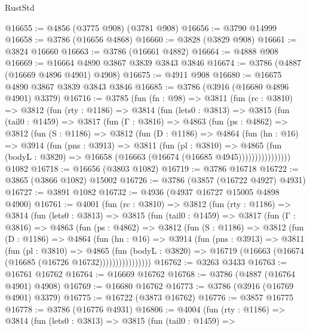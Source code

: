 \begin{lexlean}{RustStd}
\begin{coremodule}
@16655 := @4856 (@3775 @908) (@3781 @908)
@16656 := @3790 @14999
@16658 := @3786 (@16656 @4868)
@16660 := @3828 (@3829 @908)
@16661 := @3824 @16660
@16663 := @3786 (@16661 @4882)
@16664 := @4888 @908
@16669 := @16664 @4890 @3867 @3839 @3843 @3846
@16674 := @3786 (@4887 (@16669 @4896 @4901) @4908)
@16675 := @4911 @908
@16680 := @16675 @4890 @3867 @3839 @3843 @3846
@16685 := @3786 (@3916 (@16680 @4896 @4901) @3379)
@16716 := @3785
    (fun (fn : @98) =>
    @3811
      (fun (rc : @3810) =>
      @3812
        (fun (rty : @1186) =>
        @3814
          (fun (lets0 : @3813) =>
          @3815
            (fun (tail0 : @1459) =>
            @3817
              (fun (Γ : @3816) =>
              @4863
                (fun (ps : @4862) =>
                @3812
                  (fun (S : @1186) =>
                  @3812
                    (fun (D : @1186) =>
                    @4864
                      (fun (hn : @16) =>
                      @3914
                        (fun (pns : @3913) =>
                        @3811
                          (fun (pl : @3810) =>
                          @4865
                            (fun (bodyL : @3820) =>
                            @16658 (@16663 (@16674 (@16685 @4945))))))))))))))))
    @1082
@16718 := @16656 (@3803 @1082)
@16719 := @3786 @16718
@16722 := @3865 (@3866 @1082) @15002
@16726 := @3786 (@3857 (@16722 @4927) @4931)
@16727 := @3891 @1082
@16732 := @4936 (@4937 @16727 @15005 @4898 @4900)
@16761 := @4001
    (fun (rc : @3810) =>
    @3812
      (fun (rty : @1186) =>
      @3814
        (fun (lets0 : @3813) =>
        @3815
          (fun (tail0 : @1459) =>
          @3817
            (fun (Γ : @3816) =>
            @4863
              (fun (ps : @4862) =>
              @3812
                (fun (S : @1186) =>
                @3812
                  (fun (D : @1186) =>
                  @4864
                    (fun (hn : @16) =>
                    @3914
                      (fun (pns : @3913) =>
                      @3811
                        (fun (pl : @3810) =>
                        @4865
                          (fun (bodyL : @3820) =>
                          @16719 (@16663 (@16674 (@16685 (@16726 @16732))))))))))))))))
@16762 := @3263 @3433
@16763 := @16761 @16762
@16764 := @16669 @16762
@16768 := @3786 (@4887 (@16764 @4901) @4908)
@16769 := @16680 @16762
@16773 := @3786 (@3916 (@16769 @4901) @3379)
@16775 := @16722 (@3873 @16762)
@16776 := @3857 @16775
@16778 := @3786 (@16776 @4931)
@16806 := @4004
    (fun (rty : @1186) =>
    @3814
      (fun (lets0 : @3813) =>
      @3815
        (fun (tail0 : @1459) =>

\end{coremodule}
\end{lexlean}
